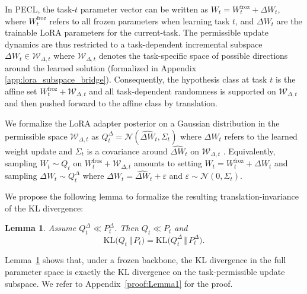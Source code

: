 \documentclass[10pt]{article} %
\newtheorem{lemma}{Lemma}
\begin{document}
In PECL, the task-$t$ parameter vector can be written as
$
W_t = W^{\mathrm{froz}}_t + \Delta W_t,
$
where $W^{\mathrm{froz}}_t$ refers to
all frozen parameters when learning task $t$, and $\Delta W_t$ are the trainable LoRA parameters for the current-task. The permissible update dynamics are thus restricted to a task-dependent incremental subspace
$
\Delta W_t \in \mathcal W_{\Delta,t}
$
where $\mathcal W_{\Delta,t}$ denotes the task-specific space of possible directions around the learned
solution (formalized in Appendix \ref{app:lora_subspace_bridge}). Consequently, the hypothesis class at task $t$ is the affine
set $W^{\mathrm{froz}}_t + \mathcal W_{\Delta,t}$ and all task-dependent randomness is supported
on $\mathcal W_{\Delta,t}$ and then pushed forward to the affine class by translation. 


We formalize the LoRA adapter posterior on a Gaussian distribution in the permissible space $\mathcal W_{\Delta,t}$ as
$
Q_t^\Delta = \mathcal N(\widehat{\Delta W}_t,\Sigma_t)$ where
$\widehat{\Delta W}_t$ refers to the learned weight update 
and $\Sigma_t$ is a covariance around $\widehat{\Delta W}_t$ on $\mathcal W_{\Delta,t}$ .
Equivalently, sampling $W_t\sim Q_t$ on $W^{\mathrm{froz}}_t+\mathcal W_{\Delta,t}$ amounts to 
setting $W_t=W^{\mathrm{froz}}_t+\Delta W_t$ and sampling $ \Delta W_t \sim Q_t^{\Delta}$ where $\Delta W_t = \widehat{\Delta W}_t + \varepsilon$
and
$
\varepsilon \sim \mathcal N(0,\Sigma_t).$




We propose the following lemma to formalize the resulting translation-invariance of the KL divergence:
\begin{lemma}
\label{lem:kl-decomp-pecl}
Assume $Q_t^\Delta \ll P_t^\Delta$. Then $Q_t \ll P_t$ and
\[
\mathrm{KL}\bigl(Q_t \,\Vert\, P_t\bigr)
=
\mathrm{KL}\bigl(Q_t^\Delta \,\Vert\, P_t^\Delta\bigr).
\]
\end{lemma}
Lemma~\ref{lem:kl-decomp-pecl} shows that, under a frozen backbone, the  KL divergence in the full parameter space is exactly the KL divergence on the task-permissible update subspace. We refer to Appendix~\ref{proof:Lemma1} for the proof.
\end{document}
